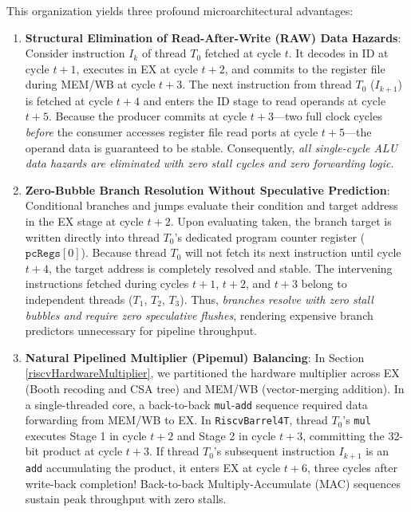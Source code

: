 This organization yields three profound microarchitectural advantages:
\begin{enumerate}
    \item \textbf{Structural Elimination of Read-After-Write (RAW) Data Hazards}:
    Consider instruction $I_k$ of thread $T_0$ fetched at cycle $t$. It decodes in ID at cycle $t+1$, executes in EX at cycle $t+2$, and commits to the register file during MEM/WB at cycle $t+3$. The next instruction from thread $T_0$ ($I_{k+1}$) is fetched at cycle $t+4$ and enters the ID stage to read operands at cycle $t+5$. Because the producer commits at cycle $t+3$---two full clock cycles \emph{before} the consumer accesses register file read ports at cycle $t+5$---the operand data is guaranteed to be stable. Consequently, \textit{all single-cycle ALU data hazards are eliminated with zero stall cycles and zero forwarding logic}.
    \item \textbf{Zero-Bubble Branch Resolution Without Speculative Prediction}:
    Conditional branches and jumps evaluate their condition and target address in the EX stage at cycle $t+2$. Upon evaluating taken, the branch target is written directly into thread $T_0$'s dedicated program counter register ($\texttt{pcRegs}[0]$). Because thread $T_0$ will not fetch its next instruction until cycle $t+4$, the target address is completely resolved and stable. The intervening instructions fetched during cycles $t+1$, $t+2$, and $t+3$ belong to independent threads ($T_1$, $T_2$, $T_3$). Thus, \textit{branches resolve with zero stall bubbles and require zero speculative flushes}, rendering expensive branch predictors unnecessary for pipeline throughput.
    \item \textbf{Natural Pipelined Multiplier (Pipemul) Balancing}:
    In Section \ref{riscvHardwareMultiplier}, we partitioned the hardware multiplier across EX (Booth recoding and CSA tree) and MEM/WB (vector-merging addition). In a single-threaded core, a back-to-back \texttt{mul}-\texttt{add} sequence required data forwarding from MEM/WB to EX. In \texttt{RiscvBarrel4T}, thread $T_0$'s \texttt{mul} executes Stage 1 in cycle $t+2$ and Stage 2 in cycle $t+3$, committing the 32-bit product at cycle $t+3$. If thread $T_0$'s subsequent instruction $I_{k+1}$ is an \texttt{add} accumulating the product, it enters EX at cycle $t+6$, three cycles after write-back completion! Back-to-back Multiply-Accumulate (MAC) sequences sustain peak throughput with zero stalls.
\end{enumerate}


